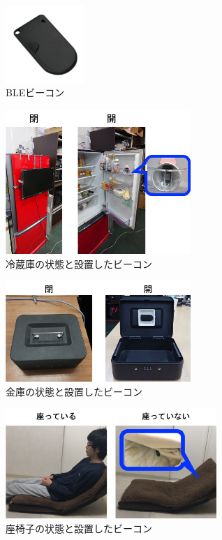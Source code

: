 \documentclass[Japanese]{dicomopapers}
\begin{document}
\begin{figure}[ht]
    \centering
    \includegraphics[width=3cm]{ble.png}
    \caption{BLEビーコン}
    \label{beacon}
   \end{figure}
\begin{figure}[ht]
    \centering
    \includegraphics[width=7cm]{regisW2.png}
    \caption{冷蔵庫の状態と設置したビーコン}
    \label{freezer}
\end{figure}
\begin{figure}[ht]
    \centering
    \includegraphics[width=7cm]{kinkoW.png}
    \caption{金庫の状態と設置したビーコン}
    \label{safe}
\end{figure}
\begin{figure}[t]
    \centering
    \includegraphics[width=8cm]{zaisuW.png}
    \caption{座椅子の状態と設置したビーコン}
    \label{chair}
\end{figure}
\end{document}
